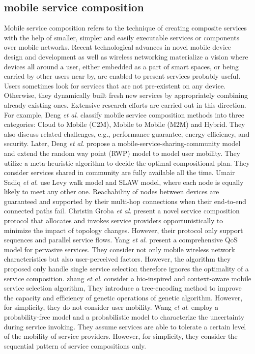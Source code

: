 \documentclass[journal]{IEEEtran}
\begin{document}
\subsection{mobile service composition}
Mobile service composition refers to the technique of creating composite services with the help of smaller, simpler and easily executable services or components over mobile networks. Recent technological advances in novel mobile device design and development as well as wireless networking materialize a vision where devices all around a user, either embedded as a part of smart spaces, or being carried by other users
near by, are enabled to present services probably useful. Users sometimes look for services that are not pre-existent on any device. Otherwise, they dynamically built fresh new services by appropriately combining already existing ones. Extensive research efforts are carried out in this direction. 
For example, Deng \emph{et al}. \cite{Deng2016} classify mobile service composition methods into three categories: Cloud to Mobile (C2M), Mobile to Mobile (M2M) and Hybrid. They also discuss related challenges, e.g., performance guarantee, energy efficiency, and security.
Later, Deng \emph{et al}. \cite{Deng2017} propose a mobile-service-sharing-community model and extend the random way point (RWP) model to model user mobility. They utilize a meta-heuristic algorithm to decide the optimal compositional plan. They consider services shared in community are fully available all the time.
Umair Sadiq \emph{et al}. \cite{sadiq2015service} use Levy walk model and SLAW model, where each node is equally likely to meet any other one. Reachability of nodes between devices are guaranteed and supported by their multi-hop connections when their end-to-end connected paths fail.
Christin Groba \emph{et al}. \cite{groba2014opportunistic} present a novel service composition protocol that allocates and invokes service providers opportunistically to minimize the impact of topology changes. However, their protocol only support sequences and parallel service flows.
Yang \emph{et al}. \cite{Yang2010} present a comprehensive QoS model for pervasive services. They consider not only mobile wireless network characteristics but also user-perceived factors. However, the algorithm they proposed only handle single service selection therefore ignores the optimality of a service composition.
zhang \emph{et al}. \cite{Zhang2016qos} consider a bio-inspired and context-aware mobile service selection algorithm, They introduce a tree-encoding method to improve the capacity and efficiency of genetic operations of genetic algorithm. However, for simplicity, they do not consider user mobility.
Wang \emph{et al}. \cite{wang2011exploiting} employ a probability-free model and a probabilistic model to characterize the uncertainty during service invoking. They assume services are able to tolerate a certain level of the mobility of service providers. However, for simplicity, they consider the sequential pattern of service compositions only.
\end{document}
